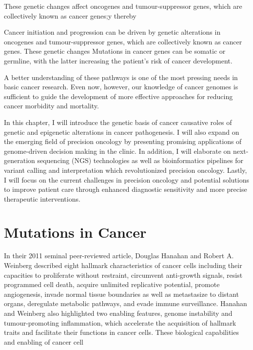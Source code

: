 These genetic changes affect oncogenes and tumour-suppressor genes, which are collectively known as cancer genes;y thereby

Cancer initiation and progression can be driven by genetic alterations in oncogenes and tumour-suppressor genes, which are collectively known as cancer genes. These genetic changes Mutations in cancer genes can be somatic or germline, with the latter increasing the patient's risk of cancer development.

A better understanding of these pathways is one of the most pressing needs in basic cancer research. Even now, however, our knowledge of cancer genomes is sufficient to guide the development of more effective approaches for reducing cancer morbidity and mortality.

In this chapter, I will introduce the genetic basis of cancer causative roles of genetic and epigenetic alterations in cancer pathogenesis. I will also expand on the emerging field of precision oncology by presenting promising applications of genome-driven decision making in the clinic. In addition, I will elaborate on next-generation sequencing (NGS) technologies as well as bioinformatics pipelines for variant calling and interpretation which revolutionized precision oncology. Lastly, I will focus on the current challenges in precision oncology and potential solutions to improve patient care through enhanced diagnostic sensitivity and more precise therapeutic interventions.

\section{Mutations in Cancer}
\label{sec:MutationsinCancer}

In their 2011 seminal peer-reviewed article, Douglas Hanahan and Robert A. Weinberg described eight hallmark characteristics of cancer cells including their capacities to proliferate without restraint, circumvent anti-growth signals, resist programmed cell death, acquire unlimited replicative potential, promote angiogenesis, invade normal tissue boundaries as well as metastasize to distant organs, deregulate metabolic pathways, and evade immune surveillance. Hanahan and Weinberg also highlighted two enabling features, genome instability and tumour-promoting inflammation, which accelerate the acquisition of hallmark traits and facilitate their functions in cancer cells. These biological capabilities and enabling of cancer cell

